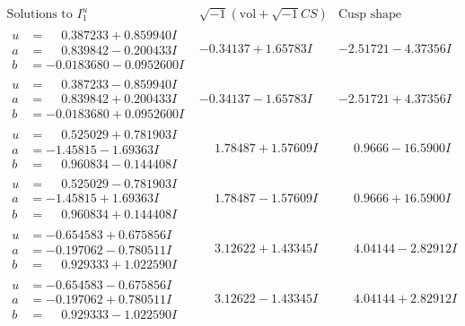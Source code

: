 \documentclass[1p]{elsarticle_modified}
\theoremstyle{definition}
\newcommand{\I}{\sqrt{-1}}
\begin{document}
$$\begin{array}{c|c|c}  
\text{Solutions to }I^u_{1}& \I (\text{vol} + \sqrt{-1}CS) & \text{Cusp shape}\\
 \hline 
\begin{aligned}
u &= \phantom{-}0.387233 + 0.859940 I \\
a &= \phantom{-}0.839842 - 0.200433 I \\
b &= -0.0183680 - 0.0952600 I\end{aligned}
 & -0.34137 + 1.65783 I & -2.51721 - 4.37356 I \\ \hline\begin{aligned}
u &= \phantom{-}0.387233 - 0.859940 I \\
a &= \phantom{-}0.839842 + 0.200433 I \\
b &= -0.0183680 + 0.0952600 I\end{aligned}
 & -0.34137 - 1.65783 I & -2.51721 + 4.37356 I \\ \hline\begin{aligned}
u &= \phantom{-}0.525029 + 0.781903 I \\
a &= -1.45815 - 1.69363 I \\
b &= \phantom{-}0.960834 - 0.144408 I\end{aligned}
 & \phantom{-}1.78487 + 1.57609 I & \phantom{-}0.9666 - 16.5900 I \\ \hline\begin{aligned}
u &= \phantom{-}0.525029 - 0.781903 I \\
a &= -1.45815 + 1.69363 I \\
b &= \phantom{-}0.960834 + 0.144408 I\end{aligned}
 & \phantom{-}1.78487 - 1.57609 I & \phantom{-}0.9666 + 16.5900 I \\ \hline\begin{aligned}
u &= -0.654583 + 0.675856 I \\
a &= -0.197062 - 0.780511 I \\
b &= \phantom{-}0.929333 + 1.022590 I\end{aligned}
 & \phantom{-}3.12622 + 1.43345 I & \phantom{-}4.04144 - 2.82912 I \\ \hline\begin{aligned}
u &= -0.654583 - 0.675856 I \\
a &= -0.197062 + 0.780511 I \\
b &= \phantom{-}0.929333 - 1.022590 I\end{aligned}
 & \phantom{-}3.12622 - 1.43345 I & \phantom{-}4.04144 + 2.82912 I \\ \hline\begin{aligned}

\end{aligned}
\end{array}$$
\end{document}
